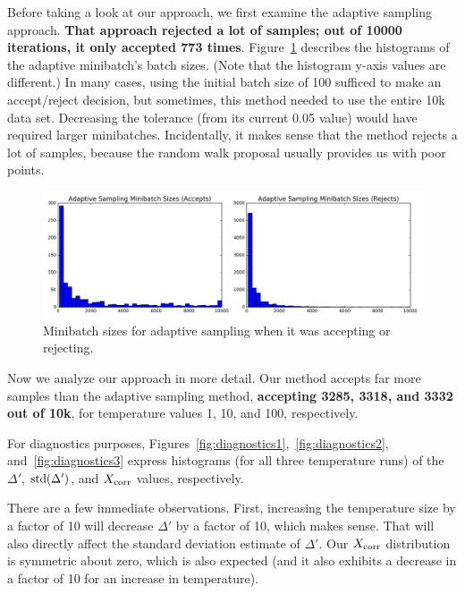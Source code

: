 \documentclass{article}
\begin{document}
Before taking a look at our approach, we first examine the adaptive sampling approach. \textbf{That
approach rejected a lot of samples; out of 10000 iterations, it only accepted 773 times}.
Figure~\ref{fig:mb_sizes} describes the histograms of the adaptive minibatch's batch sizes. (Note
that the histogram y-axis values are different.) In many cases, using the initial batch size of 100
sufficed to make an accept/reject decision, but sometimes, this method needed to use the entire 10k
data set. Decreasing the tolerance (from its current 0.05 value) would have required larger
minibatches. Incidentally, it makes sense that the method rejects a lot of samples, because the
random walk proposal usually provides us with poor points.

\begin{figure}[ht]
  \centering
  \includegraphics[width=0.75\linewidth]{adaptive_sampling_sizes_v01.png}
  \caption{Minibatch sizes for adaptive sampling when it was accepting or rejecting.}
  \label{fig:mb_sizes}
\end{figure}

Now we analyze our approach in more detail. Our method accepts far more samples than the adaptive
sampling method, \textbf{accepting 3285, 3318, and 3332 out of 10k}, for temperature values 1, 10,
and 100, respectively.

For diagnostics purposes, Figures~\ref{fig:diagnostics1},~\ref{fig:diagnostics2},
and~\ref{fig:diagnostics3} express histograms (for all three temperature runs) of the $\Delta'$,
${\rm std}(\Delta')$, and $X_{\rm corr}$ values, respectively.

There are a few immediate observations. First, increasing the temperature size by a factor of 10
will decrease $\Delta'$ by a factor of 10, which makes sense. That will also directly affect the
standard deviation estimate of $\Delta'$. Our $X_{\rm corr}$ distribution is symmetric about zero,
which is also expected (and it also exhibits a decrease in a factor of 10 for an increase
in temperature).
\end{document}
